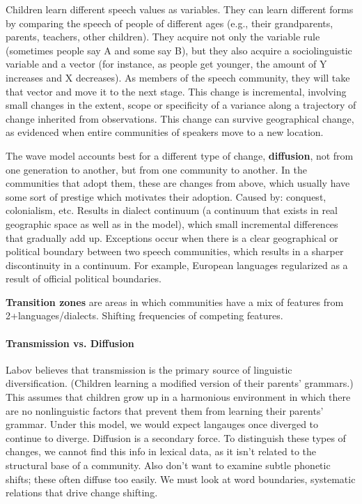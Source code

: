 \documentclass{exam}
\begin{document}
Children learn different speech values as variables. They can learn different forms by comparing the speech of people of different ages (e.g., their grandparents, parents, teachers, other children). 
They acquire not only the variable rule (sometimes people say A and some say B), but they also acquire a sociolinguistic variable and a vector (for instance, as people get younger, the amount of Y increases and X decreases). 
As members of the speech community, they will take that vector and move it to the next stage.
This change is incremental, involving small changes in the extent, scope or specificity of a variance along a trajectory of change inherited from observations. 
This change can survive geographical change, as evidenced when entire communities of speakers move to a new location. 

The wave model accounts best for a different type of change, \textbf{diffusion}, not from one generation to another, but from one community to another.  
In the communities that adopt them, these are changes from above, which usually have some sort of prestige which motivates their adoption. 
Caused by: conquest, colonialism, etc. 
Results in dialect continuum (a continuum that exists in real geographic space as well as in the model), which small incremental differences that gradually add up. 
Exceptions occur when there is a clear geographical or political boundary between two speech communities, which results in a sharper discontinuity in a continuum. 
For example, European languages regularized as a result of official political boundaries. 

\textbf{Transition zones} are areas in which communities have a mix of features from 2+languages/dialects.
Shifting frequencies of competing features. 

\paragraph{Transmission vs. Diffusion} Labov believes that transmission is the primary source of linguistic diversification. (Children learning a modified version of their parents' grammars.)
This assumes that children grow up in a harmonious environment in which there are no nonlinguistic factors that prevent them from learning their parents' grammar. 
Under this model, we would expect langauges once diverged to continue to diverge. 
Diffusion is a secondary force. 
To distinguish these types of changes, we cannot find this info in lexical data, as it isn't related to the structural base of a community. 
Also don't want to examine subtle phonetic shifts; these often diffuse too easily. 
We must look at word boundaries, systematic relations that drive change shifting.
\end{document}
